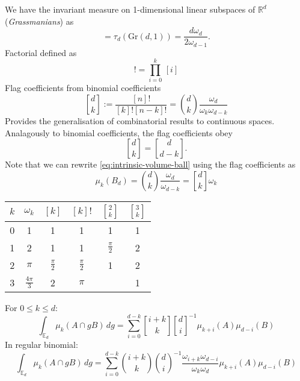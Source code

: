 We have the invariant measure on 1-dimensional linear subspaces of $\mathbb{R}^d$ (\emph{Grassmanians}) as
\begin{equation}
  [d] = \tau_d(\textrm{Gr}(d,1))
  = \frac{d \omega_d}{2 \omega_{d-1}}.
\end{equation}
Factorial defined as
\begin{equation}
  [k]! = \prod_{i=0}^k \, [i]
\end{equation}
Flag coefficients from binomial coefficients
\begin{equation}
  {d \brack k}
  := \frac{[n]!}{[k]! [n-k]!}
  = {d \choose k}
  \frac{\omega_d}{\omega_k \omega_{d-k}}
\end{equation}
Provides the generalisation of combinatorial results to continuous spaces.
Analagously to binomial coefficients, the flag coefficients obey
\begin{equation}\label{eq:flag-coefficients-symmetry}
  {d \brack k} = {d \brack d - k}.
\end{equation}
Note that we can rewrite \eqref{eq:intrinsic-volume-ball} using the flag coefficients as
\begin{equation}\label{eq:intrinsic-volume-ball-flag}
  \mu_k (B_d) = {d \choose k} \frac{\omega_d}{\omega_{d-k}}
  = {d \brack k} \omega_k
\end{equation}

\begin{center}
\begin{tabular}{cccccc}
  \toprule
  $k$ & $\omega_k$ & $[k]$ & $[k]!$ & ${2 \brack k}$ & ${3 \brack k}$ \\
  \midrule
  0 & 1 & 1 & 1 & 1 & 1 \\
  1 & 2 & 1 & 1 & $\frac{\pi}{2}$ & 2 \\
  2 & $\pi$ & $\frac{\pi}{2}$ & $\frac{\pi}{2}$ & 1 & 2 \\
  3 & $\frac{4\pi}{3}$ & 2 & $\pi$ & & 1 \\
  \bottomrule
\end{tabular}
\end{center}

\begin{theorem}
  For $0 \le k \le d$:
  \begin{equation}
    \int_{\mathbb{E}_d} \mu_k (A \cap g B) \, dg =
    \sum_{i=0}^{d-k}
    {i + k \brack k} {d \brack i}^{-1}
    \mu_{k+i}(A) \mu_{d-i}(B)
  \end{equation}
  In regular binomial:
  \begin{equation*}
    \int_{\mathbb{E}_d} \mu_k (A \cap g B) \, dg =
    \sum_{i=0}^{d-k}
    {i + k \choose k} {d \choose i}^{-1}
    \frac{\omega_{i+k} \omega_{d-i}}{\omega_k \omega_d}
    \mu_{k+i}(A) \mu_{d-i}(B)
  \end{equation*}
\end{theorem}

